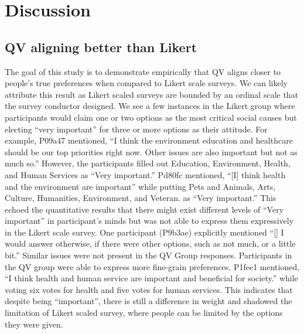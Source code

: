 \section{Discussion} \label{discussion}

\subsection{QV aligning better than Likert}
The goal of this study is to demonstrate empirically that
QV aligns closer to people's true preferences when compared to Likert scale surveys.
We can likely attribute this result as Likert scaled surveys are bounded by an ordinal scale that the survey conductor designed. 
We see a few instances in the Likert group where participants would claim one or two options as the most critical social causes but electing ``very important'' for three or more options as their attitude.
For example, P09a47 mentioned, ``I think the environment education and healthcare should be our top priorities right now. Other issues are also important but not as much so.''
However, the participants filled out Education, Environment, Health, and Human Services as ``Very important.'' 
Pd80fc mentioned, ``[I] think health and the environment are important'' while putting Pets and Animals, Arts, Culture, Humanities, Environment, and Veteran. as ``Very important.'' 
This echoed the quantitative results that there might exist different levels of ``Very important'' in participant's minds but was not able to express them expressively in the Likert scale survey.
One participant (P9b3ae) explicitly mentioned ``[\textellipsis] I would answer otherwise, if there were other options, such as not much, or a little bit.''
Similar issues were not present in the QV Group responses.
Participants in the QV group were able to express more fine-grain preferences.
P1fee1 mentioned, ``I think health and human service are important and beneficial for society.'' while voting six votes for health and five votes for human services. This indicates that despite being ``important'', there is still a difference in weight and shadowed the limitation of Likert scaled survey, where people can be limited by the options they were given.\par

